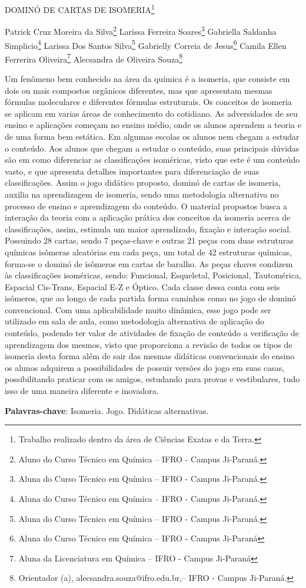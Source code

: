 \documentclass[article,12pt,onesidea,4paper,english,brazil]{abntex2}
\begin{document}
	
	
	\frenchspacing 
	
	\begin{center}
		\LARGE DOMINÓ DE CARTAS DE ISOMERIA\footnote{Trabalho realizado dentro da área de Ciências Exatas e da Terra.}
		
		\normalsize
		Patrick Cruz Moreira da Silva\footnote{Aluno do Curso Técnico em Química – IFRO - Campus Ji-Paraná.} 
		Larissa Ferreira Soares\footnote{Aluna do Curso Técnico em Química – IFRO - Campus Ji-Paraná.} 
		Gabriella Saldanha Simplicio\footnote{Aluna do Curso Técnico em Química – IFRO - Campus Ji-Paraná.} 
		Larissa Dos Santos Silva\footnote{Aluna do Curso Técnico em Química – IFRO - Campus Ji-Paraná.}
		Gabrielly Correia de Jesus\footnote{Aluna do Curso Técnico em Química – IFRO - Campus Ji-Paraná}
		Camila Ellen Ferrerira Oliveira\footnote{Aluna da Licenciatura em Química – IFRO - Campus Ji-Paraná}
		Alecsandra de Oliveira Souza\footnote{Orientador (a), alecsandra.souza@ifro.edu.br,– IFRO - Campus Ji-Paraná.} 
	\end{center}
	
	\noindent Um fenômeno bem conhecido na área da química é a isomeria, que consiste em
	dois ou mais compostos orgânicos diferentes, mas que apresentam mesmas
	fórmulas moleculares e diferentes fórmulas estruturais. Os conceitos de isomeria se
	aplicam em varias áreas de conhecimento do cotidiano. As adversidades de seu
	ensino e aplicações começam no ensino médio, onde os alunos aprendem a teoria e
	de uma forma bem estática. Em algumas escolas os alunos nem chegam a estudar
	o conteúdo. Aos alunos que chegam a estudar o conteúdo, suas principais dúvidas
	são em como diferenciar as classificações isoméricas, visto que este é um conteúdo
	vasto, e que apresenta detalhes importantes para diferenciação de suas
	classificações. Assim o jogo didático proposto, dominó de cartas de isomeria, auxilia
	na aprendizagem de isomeria, sendo uma metodologia alternativa no processo de
	ensino e aprendizagem do conteúdo. O material propostos busca a interação da
	teoria com a aplicação prática dos conceitos da isomeria acerca de classificações,
	assim, estimula um maior aprendizado, fixação e interação social. Possuindo 28
	cartas, sendo 7 peças-chave e outras 21 peças com duas estruturas químicas
	isômeras aleatórias em cada peça, um total de 42 estruturas químicas, forma-se o
	dominó de isômeros em cartas de baralho. As peças chaves condizem às
	classificações isoméricas, sendo: Funcional, Esqueletal, Posicional, Tautomérica,
	Espacial Cis-Trans, Espacial E-Z e Óptico. Cada classe dessa conta com seis
	isômeros, que ao longo de cada partida forma caminhos como no jogo de dominó
	convencional. Com uma aplicabilidade muito dinâmica, esse jogo pode ser utilizado
	em sala de aula, como metodologia alternativa de aplicação do conteúdo, podendo
	ter valor de atividades de fixação de conteúdo a verificação de aprendizagem dos
	mesmos, visto que proporciona a revisão de todos os tipos de isomeria desta forma
	além de sair das mesmas didáticas convencionais do ensino os alunos adquirem a
	possibilidades de possuir versões do jogo em suas casas, possibilitando praticar
	com os amigos, estudando para provas e vestibulares, tudo isso de uma maneira
	diferente e inovadora.
	
	\vspace{\onelineskip}
	
	\noindent
	\textbf{Palavras-chave}: Isomeria. Jogo. Didáticas alternativas.
	
\end{document}
